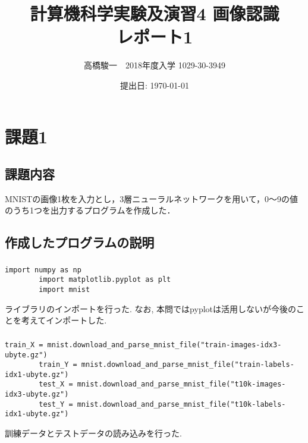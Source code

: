 \documentclass[a4j, titlepage]{jarticle}
\begin{document}
\title{計算機科学実験及演習4 画像認識　\\ \bf レポート1}
\author{高橋駿一　2018年度入学 1029-30-3949}
\date{提出日: \today} %
\maketitle

\clearpage

\section*{課題1}
\subsection*{課題内容}
MNISTの画像1枚を入力とし，3層ニューラルネットワークを用いて，0～9の値のうち1つを出力するプログラムを作成した．

\subsection*{作成したプログラムの説明}
    \subsubsection*{}
        \begin{lstlisting}[caption=ライブラリのインポート,label=fuga]
        import numpy as np
        import matplotlib.pyplot as plt
        import mnist
        \end{lstlisting}
        ライブラリのインポートを行った.
        なお, 本問ではpyplotは活用しないが今後のことを考えてインポートした.

    \subsubsection*{}
        \begin{lstlisting}[caption=ライブラリのインポート,label=fuga]
        train_X = mnist.download_and_parse_mnist_file("train-images-idx3-ubyte.gz")
        train_Y = mnist.download_and_parse_mnist_file("train-labels-idx1-ubyte.gz")
        test_X = mnist.download_and_parse_mnist_file("t10k-images-idx3-ubyte.gz")
        test_Y = mnist.download_and_parse_mnist_file("t10k-labels-idx1-ubyte.gz")
        \end{lstlisting}
        訓練データとテストデータの読み込みを行った.
\end{document}

